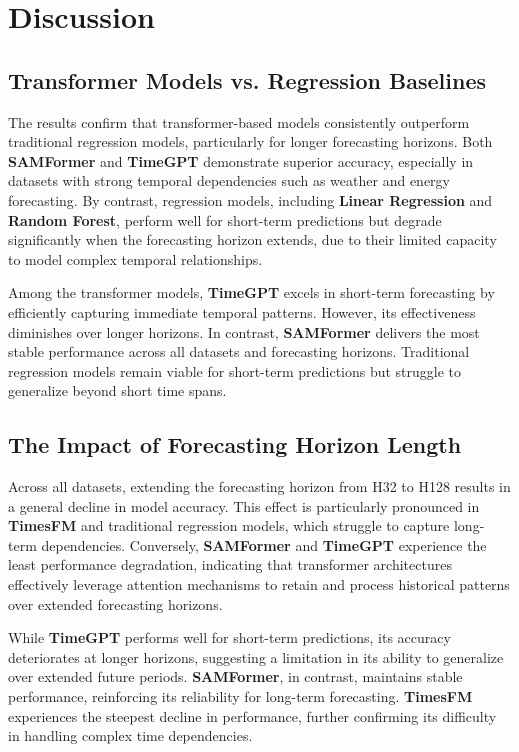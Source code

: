 \chapter{Discussion}\label{ch05:discussion}

\section{Transformer Models vs. Regression Baselines}
The results confirm that transformer-based models consistently outperform traditional regression models, particularly for longer forecasting horizons. Both \textbf{SAMFormer} and \textbf{TimeGPT} demonstrate superior accuracy, especially in datasets with strong temporal dependencies such as weather and energy forecasting. By contrast, regression models, including \textbf{Linear Regression} and \textbf{Random Forest}, perform well for short-term predictions but degrade significantly when the forecasting horizon extends, due to their limited capacity to model complex temporal relationships.

Among the transformer models, \textbf{TimeGPT} excels in short-term forecasting by efficiently capturing immediate temporal patterns. However, its effectiveness diminishes over longer horizons. In contrast, \textbf{SAMFormer} delivers the most stable performance across all datasets and forecasting horizons. Traditional regression models remain viable for short-term predictions but struggle to generalize beyond short time spans.

\section{The Impact of Forecasting Horizon Length}
Across all datasets, extending the forecasting horizon from H32 to H128 results in a general decline in model accuracy. This effect is particularly pronounced in \textbf{TimesFM} and traditional regression models, which struggle to capture long-term dependencies. Conversely, \textbf{SAMFormer} and \textbf{TimeGPT} experience the least performance degradation, indicating that transformer architectures effectively leverage attention mechanisms to retain and process historical patterns over extended forecasting horizons.

While \textbf{TimeGPT} performs well for short-term predictions, its accuracy deteriorates at longer horizons, suggesting a limitation in its ability to generalize over extended future periods. \textbf{SAMFormer}, in contrast, maintains stable performance, reinforcing its reliability for long-term forecasting. \textbf{TimesFM} experiences the steepest decline in performance, further confirming its difficulty in handling complex time dependencies.

